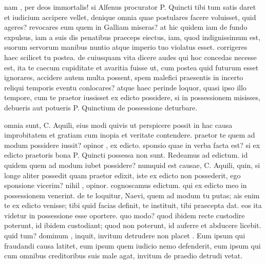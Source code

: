  nam , per deos immortalis! si Alfenus procurator P. Quincti tibi tum satis daret et iudicium accipere vellet, denique omnia quae postulares facere voluisset, quid ageres? revocares eum quem in Galliam miseras? at hic quidem iam de fundo expulsus, iam a suis dis penatibus praeceps eiectus, iam, quod indignissimum est, suorum servorum manibus nuntio atque imperio tuo violatus esset. corrigeres haec scilicet tu postea. de cuiusquam vita dicere audes qui hoc concedas necesse est, ita te caecum cupiditate et avaritia fuisse ut, cum postea quid futurum esset ignorares, accidere autem multa possent, spem malefici praesentis in incerto reliqui temporis eventu conlocares? atque haec perinde loquor, quasi ipso illo tempore, cum te praetor iussisset ex edicto possidere, si in possessionem misisses, debueris aut potueris P. Quinctium de possessione deturbare.

 omnia sunt, C. Aquili, eius modi quivis ut perspicere possit in hac causa improbitatem et gratiam cum inopia et veritate contendere. praetor te quem ad modum possidere iussit? opinor , ex edicto. sponsio quae in verba facta est? si ex edicto praetoris bona P. Quincti possessa non sunt. Redeamus ad edictum. id quidem quem ad modum iubet possidere? numquid est causae, C. Aquili, quin, si longe aliter possedit quam praetor edixit, iste ex edicto non possederit, ego sponsione vicerim? nihil , opinor. cognoscamus edictum. qui ex edicto meo in possessionem venerint. de te loquitur, Naevi, quem ad modum tu putas; ais enim te ex edicto venisse; tibi quid facias definit, te instituit, tibi praecepta dat. eos ita videtur in possessione esse oportere. quo modo? quod ibidem recte custodire poterunt, id ibidem custodiant; quod non poterunt, id auferre et abducere licebit. quid tum? dominum , inquit, invitum detrudere non placet . Eum ipsum qui fraudandi causa latitet, eum ipsum quem iudicio nemo defenderit, eum ipsum qui cum omnibus creditoribus suis male agat, invitum de praedio detrudi vetat.


